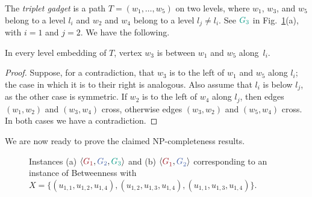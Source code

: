 \documentclass{llncs}
\newcommand{\red}[1]{{\color{red}{#1\xspace}}}
\newcommand{\blue}[1]{{\color{blue}{#1\xspace}}}
\newcommand{\green}[1]{{\color{green}{#1\xspace}}}
\newcommand{\sefeinstance}[1]{$\langle\red{G^{#1}_1},\blue{G^{#1}_2}\rangle$\xspace}
\begin{document}
The {\em triplet gadget} is a path $T=(w_1,\dots,w_5)$ on two levels, where $w_1$, $w_3$, and $w_5$ belong to a level $l_i$ and $w_2$ and $w_4$ belong to a level $l_j\neq l_i$. See $\green{G_3}$ in Fig.~\ref{fig:simultaneous-level}(a), with $i=1$ and $j=2$. We have the following.

\begin{lemma} \label{le:sl-triplet}
In every level embedding of $T$, vertex $w_3$ is between $w_1$ and $w_5$ along~$l_i$.
\end{lemma} 

\begin{proof}
	Suppose, for a contradiction, that $w_3$ is to the left of $w_1$ and $w_5$ along $l_i$; the case in which it is to their right is analogous. Also assume that $l_i$ is below $l_j$, as the other case is symmetric. If $w_2$ is to the left of $w_4$ along $l_j$, then edges $(w_1,w_2)$ and $(w_3,w_4)$ cross, otherwise edges $(w_3,w_2)$ and $(w_5,w_4)$ cross. In both cases we have a contradiction.
\end{proof}

We are now ready to prove the claimed {\cal NP}-completeness results.

\begin{figure}[tb]
\centering
{} 
\caption{Instances (a) $\langle \red{G_1},\blue{G_2},\green{G_3} \rangle$ and (b) \sefeinstance{} corresponding to an instance of {\sc Betweenness} with $X=\{(u_{1,1},u_{1,2},u_{1,4}),(u_{1,2},u_{1,3},u_{1,4}),(u_{1,1},u_{1,3},u_{1,4})\}$.} 
\label{fig:simultaneous-level}
\end{figure}
\end{document}
